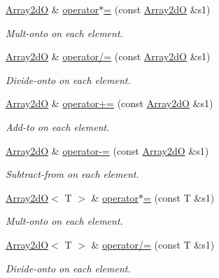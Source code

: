 \begin{DoxyCompactItemize}
\mbox{\hyperlink{classADAT_1_1Array2dO}{Array2dO}} \& \mbox{\hyperlink{classADAT_1_1Array2dO_af8304f9edc7ab12b002b6a96f02a2111}{operator$\ast$=}} (const \mbox{\hyperlink{classADAT_1_1Array2dO}{Array2dO}} \&s1)
\begin{DoxyCompactList}\small\item\em Mult-\/onto on each element. \end{DoxyCompactList}\item 
\mbox{\hyperlink{classADAT_1_1Array2dO}{Array2dO}} \& \mbox{\hyperlink{classADAT_1_1Array2dO_a04e77d7a878bbf9ecf4e890848f09009}{operator/=}} (const \mbox{\hyperlink{classADAT_1_1Array2dO}{Array2dO}} \&s1)
\begin{DoxyCompactList}\small\item\em Divide-\/onto on each element. \end{DoxyCompactList}\item 
\mbox{\hyperlink{classADAT_1_1Array2dO}{Array2dO}} \& \mbox{\hyperlink{classADAT_1_1Array2dO_ad74aea8e13378655e8abe2a2bbddb7bc}{operator+=}} (const \mbox{\hyperlink{classADAT_1_1Array2dO}{Array2dO}} \&s1)
\begin{DoxyCompactList}\small\item\em Add-\/to on each element. \end{DoxyCompactList}\item 
\mbox{\hyperlink{classADAT_1_1Array2dO}{Array2dO}} \& \mbox{\hyperlink{classADAT_1_1Array2dO_a16fa54fe6c722762ce47b1d9f56b195a}{operator-\/=}} (const \mbox{\hyperlink{classADAT_1_1Array2dO}{Array2dO}} \&s1)
\begin{DoxyCompactList}\small\item\em Subtract-\/from on each element. \end{DoxyCompactList}\item 
\mbox{\hyperlink{classADAT_1_1Array2dO}{Array2dO}}$<$ T $>$ \& \mbox{\hyperlink{classADAT_1_1Array2dO_a12856ac75f975aa6b013eac9eadd7180}{operator$\ast$=}} (const T \&s1)
\begin{DoxyCompactList}\small\item\em Mult-\/onto on each element. \end{DoxyCompactList}\item 
\mbox{\hyperlink{classADAT_1_1Array2dO}{Array2dO}}$<$ T $>$ \& \mbox{\hyperlink{classADAT_1_1Array2dO_ae0c954c51dfb1165b2afdd6152417fcf}{operator/=}} (const T \&s1)
\begin{DoxyCompactList}\small\item\em Divide-\/onto on each element. \end{DoxyCompactList}\item 

\end{DoxyCompactItemize}
